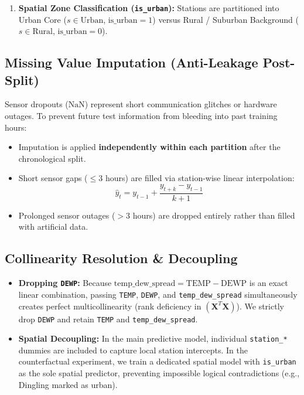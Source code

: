 \documentclass[a4paper,12pt,twocolumn]{article}
\begin{document}
\begin{enumerate}
\begin{itemize}
        \item \texttt{SW} (Polluted Industrial Corridor): \texttt{W}, \texttt{WSW}, \texttt{SW}, \texttt{SSW}.
        \item \texttt{SE} (Humid Marine Air): \texttt{S}, \texttt{SSE}, \texttt{SE}, \texttt{ESE}, \texttt{E}.
        \item \texttt{CV} (Calm / Variable Stagnation): Wind speed $< 0.5\,\text{m/s}$.
    \end{itemize}
    \item \textbf{Spatial Zone Classification (\texttt{is\_urban}):} Stations are partitioned into Urban Core ($s \in \text{Urban}$, $\text{is\_urban} = 1$) versus Rural / Suburban Background ($s \in \text{Rural}$, $\text{is\_urban} = 0$).
\end{enumerate}

\subsection{Missing Value Imputation (Anti-Leakage Post-Split)}
Sensor dropouts ($\text{NaN}$) represent short communication glitches or hardware outages. To prevent future test information from bleeding into past training hours:
\begin{itemize}
    \item Imputation is applied \textbf{independently within each partition} after the chronological split.
    \item Short sensor gaps ($\le 3$ hours) are filled via station-wise linear interpolation:
    \begin{equation}
    \hat{y}_{t} = y_{t-1} + \frac{y_{t+k} - y_{t-1}}{k+1}
    \end{equation}
    \item Prolonged sensor outages ($> 3$ hours) are dropped entirely rather than filled with artificial data.
\end{itemize}

\subsection{Collinearity Resolution \& Decoupling}
\begin{itemize}
    \item \textbf{Dropping \texttt{DEWP}:} Because $\text{temp\_dew\_spread} = \text{TEMP} - \text{DEWP}$ is an exact linear combination, passing \texttt{TEMP}, \texttt{DEWP}, and \texttt{temp\_dew\_spread} simultaneously creates perfect multicollinearity (rank deficiency in $(\mathbf{X}^T \mathbf{X})$). We strictly drop \texttt{DEWP} and retain \texttt{TEMP} and \texttt{temp\_dew\_spread}.
    \item \textbf{Spatial Decoupling:} In the main predictive model, individual \texttt{station\_*} dummies are included to capture local station intercepts. In the counterfactual experiment, we train a dedicated spatial model with \texttt{is\_urban} as the sole spatial predictor, preventing impossible logical contradictions (e.g., Dingling marked as urban).
\end{itemize}
\end{document}
